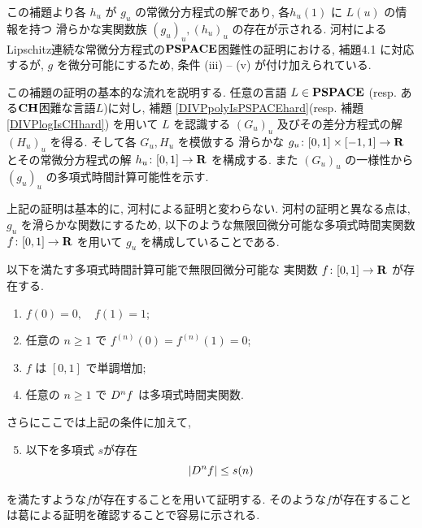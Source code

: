  この補題より各 $h_u$ が $g_u$ の常微分方程式の解であり, 
 各$h_u(1)$ に $L(u)$ の情報を持つ
 滑らかな実関数族 $(g_u)_u, (h_u)_u$ の存在が示される.
 河村によるLipschitz連続な常微分方程式の$\mathbf{PSPACE}$困難性の証明における,
 補題4.1 に対応するが,
 $g$ を微分可能にするため, 条件 (iii) -- (v) が付け加えられている.


 この補題の証明の基本的な流れを説明する.
 任意の言語 $L \in \mathbf{PSPACE}$ (resp. ある$\mathbf{CH}$困難な言語$L$)に対し, 
 補題 \ref{DIVPpolyIsPSPACEhard}(resp. 補題 \ref{DIVPlogIsCHhard})
 を用いて $L$ を認識する $(G_u)_u$ 
 及びその差分方程式の解 $(H_u)_u$ を得る.
 そして各 $G_u, H_u$ を模倣する
 滑らかな $g_u \colon [0,1] \times [-1, 1] \to \mathbf R$ 
 とその常微分方程式の解 $h_u \colon [0,1] \to \mathbf R$ を構成する.
 また $(G_u)_u$ の一様性から $(g_u)_u$ の多項式時間計算可能性を示す.

 上記の証明は基本的に, 河村による証明と変わらない\cite[補題4.1]{kawamura2010lipschitz}.
 河村の証明と異なる点は, $g_u$ を滑らかな関数にするため, 
 以下のような無限回微分可能な多項式時間実関数 $f \colon [0,1] \to \mathbf R$ を用いて
 $g_u$ を構成していることである.

 \begin{lemma}
  \label{SmoothFunction}
  以下を満たす多項式時間計算可能で無限回微分可能な
  実関数 $f \colon [0,1] \to \mathbf R$ が存在する.

  \begin{enumerate}
   \item $f(0) = 0, \quad f(1) = 1$;
   \item 任意の $n \ge 1$ で $f^{(n)}(0) = f^{(n)}(1) = 0$;
   \item $f$ は $[0,1]$ で単調増加;
   \item 任意の $n \ge 1$ で $D^n f$ は多項式時間実関数.
  \end{enumerate}
 \end{lemma}

 さらにここでは上記の条件に加えて, 
 \begin{enumerate}
  \setcounter{enumi}{4} 
  \item 以下を多項式 $s$が存在
	\begin{equation} \label{enum:polynomial-size}
	 |D^n f| \le s(n)
	\end{equation}
 \end{enumerate}
 を満たすような$f$が存在することを用いて証明する.
 そのような$f$が存在することは葛による証明を確認することで容易に示される.

